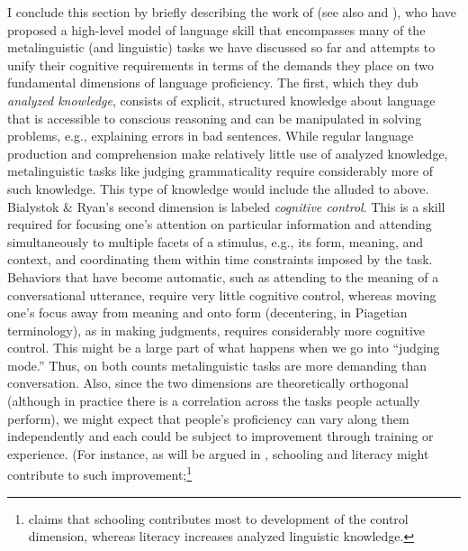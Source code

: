 I conclude this section by briefly describing the work of \citet{BialystokEtAl1985} (see also \citealt{RyanEtAl1984} and \citealt{Bialystok1986}), 
who have proposed a high-level model of language skill that encompasses many of the metalinguistic (and linguistic) tasks we have discussed so far and attempts to unify their cognitive requirements in terms of the demands they place on two fundamental dimensions of language proficiency. The first, which they dub \textit{analyzed knowledge}, consists of explicit, structured knowledge about language that is accessible to conscious reasoning and can be manipulated in solving problems, e.g., explaining errors in bad sentences. While regular language production and comprehension
make relatively little use of analyzed knowledge, metalinguistic tasks like judging grammaticality require considerably more of such knowledge. This type of knowledge would include the  alluded to above. Bialystok \& Ryan's second dimension is labeled \textit{cognitive control}. This is a skill required for focusing one's attention on particular information and attending simultaneously to multiple facets of a stimulus, e.g., its form, meaning, and context, and coordinating them within time constraints imposed by the task. Behaviors that have become automatic, such as attending to the meaning of a conversational utterance, require very little cognitive control, whereas moving one's focus away from meaning and onto form (decentering, in Piagetian terminology), as in making judgments, requires considerably more cognitive control. This might be a large part of what happens when we go into ``judging mode.'' Thus, on both counts metalinguistic tasks are more demanding than conversation. Also, since the two dimensions are theoretically orthogonal (although in practice there is a correlation across the tasks people actually perform), we might expect that people's proficiency can vary along them independently and each could be subject to improvement through training or experience. (For instance, as will be argued in , schooling and literacy might contribute to such improvement;\footnote{\citet{Bialystok1986} claims that schooling contributes most to development of the control dimension, whereas literacy increases analyzed linguistic knowledge.
}
